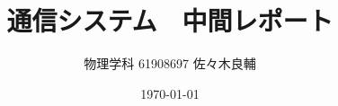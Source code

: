 \documentclass[uplatex,a4j,11pt, titlepage]{jsarticle}
\begin{document}
\title{通信システム　中間レポート}
\author{物理学科 61908697 佐々木良輔}
\date{\today}
\maketitle





\end{document}
